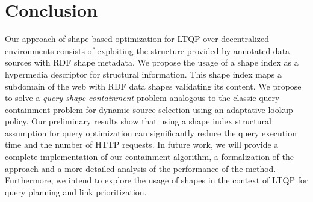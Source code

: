 \section{Conclusion}
Our approach of shape-based optimization for LTQP over decentralized environments consists of exploiting the structure provided by
annotated data sources with RDF shape metadata. 
We propose the usage of a shape index as a hypermedia descriptor for structural information.
This shape index maps a subdomain of the web with RDF data shapes validating its content.
We propose to solve a \emph{query-shape containment} problem analogous to the classic query containment problem for dynamic source selection
using an adaptative lookup policy. 
Our preliminary results show that using a shape index structural assumption for query optimization
can significantly reduce the query execution time and the number of HTTP requests.
In future work, we will provide a complete implementation of our containment algorithm,
a formalization of the approach and a more detailed analysis of the performance of the method.
Furthermore, we intend to explore the usage of shapes in the context of LTQP for query planning and link prioritization.